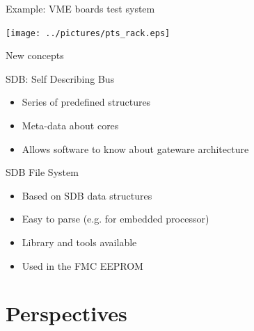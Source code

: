\documentclass[compress,red]{beamer}
\begin{document}
\begin{frame}{Example: VME boards test system}

  \begin{center}
    \texttt{[image: ../pictures/pts\_rack.eps]}
  \end{center}

  \note[item]{}

\end{frame}

\begin{frame}{New concepts}

  \begin{block}{SDB: Self Describing Bus}
    \begin{itemize}
    \item Series of predefined structures
    \item Meta-data about cores
    \item Allows software to know about gateware architecture
    \end{itemize}
  \end{block}

  \begin{block}{SDB File System}
    \begin{itemize}
    \item Based on SDB data structures
    \item Easy to parse (e.g. for embedded processor)
    \item Library and tools available %
    \item Used in the FMC EEPROM
    \end{itemize}
  \end{block}

  \note[item]{}

\end{frame}



\section{Perspectives}

\subsection*{} %
\end{document}
